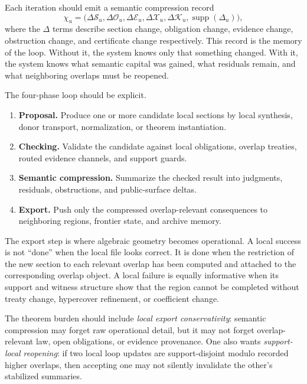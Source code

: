 \documentclass[11pt]{report}
\begin{document}
Each iteration should emit a semantic compression record
\[
\chi_u
=
\bigl(
\Delta\mathcal{S}_u,
\Delta\mathcal{O}_u,
\Delta\mathcal{E}_u,
\Delta\mathcal{X}_u,
\Delta\mathcal{K}_u,
\operatorname{supp}(\Delta_u)
\bigr),
\]
where the $\Delta$ terms describe section change, obligation change, evidence change, obstruction change, and certificate change respectively. This record is the memory of the loop. Without it, the system knows only that something changed. With it, the system knows what semantic capital was gained, what residuals remain, and what neighboring overlaps must be reopened.

The four-phase loop should be explicit.
\begin{enumerate}
\item \textbf{Proposal.} Produce one or more candidate local sections by local synthesis, donor transport, normalization, or theorem instantiation.
\item \textbf{Checking.} Validate the candidate against local obligations, overlap treaties, routed evidence channels, and support guards.
\item \textbf{Semantic compression.} Summarize the checked result into judgments, residuals, obstructions, and public-surface deltas.
\item \textbf{Export.} Push only the compressed overlap-relevant consequences to neighboring regions, frontier state, and archive memory.
\end{enumerate}

The export step is where algebraic geometry becomes operational. A local success is not ``done'' when the local file looks correct. It is done when the restriction of the new section to each relevant overlap has been computed and attached to the corresponding overlap object. A local failure is equally informative when its support and witness structure show that the region cannot be completed without treaty change, hypercover refinement, or coefficient change.

The theorem burden should include \emph{local export conservativity}: semantic compression may forget raw operational detail, but it may not forget overlap-relevant law, open obligations, or evidence provenance. One also wants \emph{support-local reopening}: if two local loop updates are support-disjoint modulo recorded higher overlaps, then accepting one may not silently invalidate the other's stabilized summaries.
\end{document}
